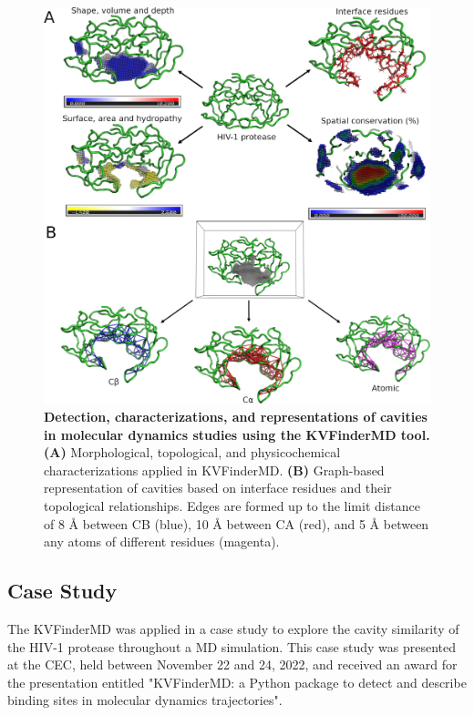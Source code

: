 \documentclass[Ingles]{phdthesis}
\begin{document}
\begin{figure}[h]
  \centering
  \includegraphics[scale=0.75]{images/kvmd-overview.png}
  \caption[Detection, characterizations, and representations of cavities in molecular dynamics studies using the KVFinderMD tool.]{\textbf{Detection, characterizations, and representations of cavities in molecular dynamics studies using the KVFinderMD tool.} \textbf{(A)} Morphological, topological, and physicochemical characterizations applied in KVFinderMD. \textbf{(B)} Graph-based representation of cavities based on interface residues and their topological relationships. Edges are formed up to the limit distance of  8 Å between \acs{CB} (blue), 10 Å between \acs{CA} (red), and 5 Å between any atoms of different residues (magenta).}
  \label{fig:kvmd-overview}
\end{figure}

\subsection{Case Study}

The KVFinderMD was applied in a case study to explore the cavity similarity of the HIV-1 protease throughout a \acs{MD} simulation. This case study was presented at the \ac{CEC}, held between November 22 and 24, 2022, and received an award for the presentation entitled "KVFinderMD: a Python package to detect and describe binding sites in molecular dynamics trajectories".
\end{document}
